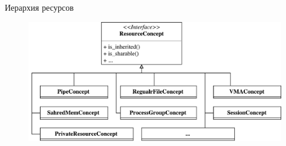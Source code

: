 \begin{frame}{Иерархия ресурсов}
	\begin{figure}[ht!]
	\centering
	\includegraphics[width=\textwidth]{fig/resourceConceptStruct}
	\end{figure}
\end{frame}

\backupend


